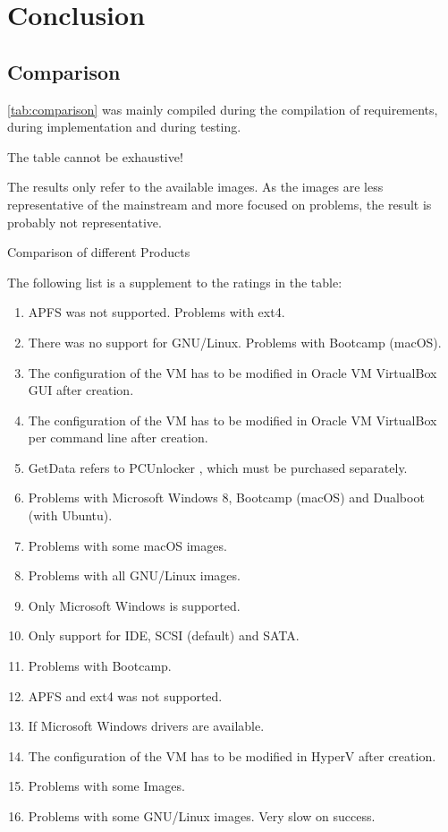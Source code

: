 \chapter{Conclusion}
\label{chap:conclusion}

\section{Comparison}

\cref{tab:comparison} was mainly compiled during the compilation of requirements, during implementation and during testing.

The table cannot be exhaustive!

The results only refer to the available images. As the images are less representative of the mainstream and more focused on problems, the result is probably not representative.

\begin{table}[htbp]
  \centering
  \caption[Comparison]{Comparison of different Products}
  \label{tab:comparison}
\end{table}

The following list is a supplement to the ratings in the table:

\begin{enumerate}
  \item APFS was not supported. Problems with ext4.
  \item There was no support for GNU/Linux. Problems with Bootcamp (macOS).
  \item The configuration of the VM has to be modified in Oracle VM VirtualBox GUI after creation.
  \item The configuration of the VM has to be modified in Oracle VM VirtualBox per command line after creation.
  \item GetData refers to PCUnlocker \cite{PCUnlocker}, which must be purchased separately.
  \item Problems with Microsoft Windows 8, Bootcamp (macOS) and Dualboot (with Ubuntu).
  \item Problems with some macOS images.
  \item Problems with all GNU/Linux images.
  \item Only Microsoft Windows is supported.
  \item Only support for IDE, SCSI (default) and SATA.
  \item Problems with Bootcamp.
  \item APFS and ext4 was not supported.
  \item If Microsoft Windows drivers are available.
  \item The configuration of the VM has to be modified in HyperV after creation.
  \item Problems with some Images.
  \item Problems with some GNU/Linux images. Very slow on success.
\end{enumerate}

